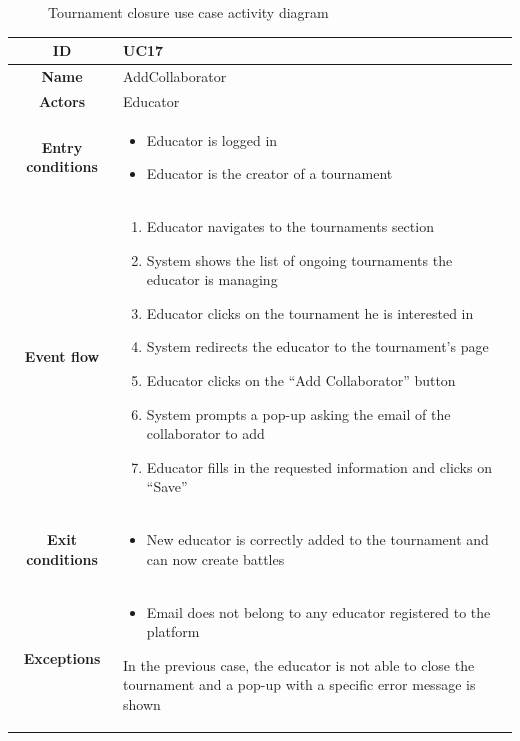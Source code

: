 \begin{center}
\begin{figure}[H]
        \caption{Tournament closure use case activity diagram}
    \end{figure}
    \begin{tabular}{ |c|m{10cm}| }
        \hline
        \textbf{ID} & UC17 \\
        \hline
        \textbf{Name} & AddCollaborator \\
        \hline
        \textbf{Actors} & Educator \\
        \hline
        \textbf{Entry conditions} &
        \begin{itemize}
            \item Educator is logged in
            \item Educator is the creator of a tournament
        \end{itemize} \\
        \hline
        \textbf{Event flow} &
        \begin{enumerate}
            \item Educator navigates to the tournaments section
            \item System shows the list of ongoing tournaments the educator is managing
            \item Educator clicks on the tournament he is interested in
            \item System redirects the educator to the tournament’s page
            \item Educator clicks on the “Add Collaborator” button
            \item System prompts a pop-up asking the email of the collaborator to add
            \item Educator fills in the requested information and clicks on  “Save”
        \end{enumerate} \\
        \hline
        \textbf{Exit conditions} &
        \begin{itemize}
            \item New educator is correctly added to the tournament and can now create battles
        \end{itemize} \\
        \hline
        \textbf{Exceptions} & 
        \begin{itemize}
            \item Email does not belong to any educator registered to the platform
        \end{itemize} 
        In the previous case, the educator is not able to close the tournament and a pop-up with a specific error message is shown \\

\end{tabular}
\end{center}
